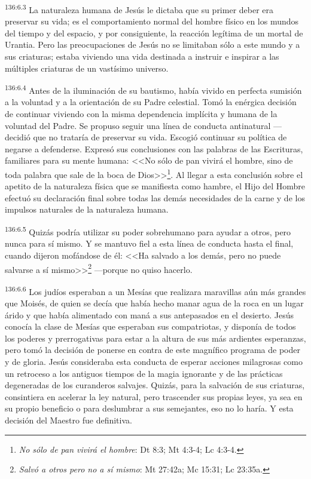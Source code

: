 \par 
\textsuperscript{136:6.3} La naturaleza humana de Jesús le dictaba que su primer deber era preservar su vida; es el comportamiento normal del hombre físico en los mundos del tiempo y del espacio, y por consiguiente, la reacción legítima de un mortal de Urantia. Pero las preocupaciones de Jesús no se limitaban sólo a este mundo y a sus criaturas; estaba viviendo una vida destinada a instruir e inspirar a las múltiples criaturas de un vastísimo universo.

\par 
\textsuperscript{136:6.4} Antes de la iluminación de su bautismo, había vivido en perfecta sumisión a la voluntad y a la orientación de su Padre celestial. Tomó la enérgica decisión de continuar viviendo con la misma dependencia implícita y humana de la voluntad del Padre. Se propuso seguir una línea de conducta antinatural ---decidió que no trataría de preservar su vida. Escogió continuar su política de negarse a defenderse. Expresó sus conclusiones con las palabras de las Escrituras, familiares para su mente humana: <<No sólo de pan vivirá el hombre, sino de toda palabra que sale de la boca de Dios>>\footnote{\textit{No sólo de pan vivirá el hombre}: Dt 8:3; Mt 4:3-4; Lc 4:3-4.}. Al llegar a esta conclusión sobre el apetito de la naturaleza física que se manifiesta como hambre, el Hijo del Hombre efectuó su declaración final sobre todas las demás necesidades de la carne y de los impulsos naturales de la naturaleza humana.

\par 
\textsuperscript{136:6.5} Quizás podría utilizar su poder sobrehumano para ayudar a otros, pero nunca para sí mismo. Y se mantuvo fiel a esta línea de conducta hasta el final, cuando dijeron mofándose de él: <<Ha salvado a los demás, pero no puede salvarse a sí mismo>>\footnote{\textit{Salvó a otros pero no a sí mismo}: Mt 27:42a; Mc 15:31; Lc 23:35a.} ---porque no quiso hacerlo.

\par 
\textsuperscript{136:6.6} Los judíos esperaban a un Mesías que realizara maravillas aún más grandes que Moisés, de quien se decía que había hecho manar agua de la roca en un lugar árido y que había alimentado con maná a sus antepasados en el desierto. Jesús conocía la clase de Mesías que esperaban sus compatriotas, y disponía de todos los poderes y prerrogativas para estar a la altura de sus más ardientes esperanzas, pero tomó la decisión de ponerse en contra de este magnífico programa de poder y de gloria. Jesús consideraba esta conducta de esperar acciones milagrosas como un retroceso a los antiguos tiempos de la magia ignorante y de las prácticas degeneradas de los curanderos salvajes. Quizás, para la salvación de sus criaturas, consintiera en acelerar la ley natural, pero trascender sus propias leyes, ya sea en su propio beneficio o para deslumbrar a sus semejantes, eso no lo haría. Y esta decisión del Maestro fue definitiva.

